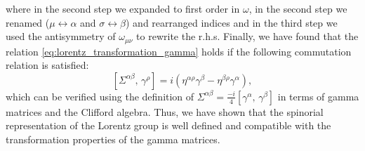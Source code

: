 where in the second step we expanded to first order in \(\omega\), in the second step we renamed (\(\mu \leftrightarrow \alpha\) and \(\sigma \leftrightarrow \beta\)) and rearranged indices and in the third step we used the antisymmetry of \(\omega_{\mu \nu}\) to rewrite the r.h.s. Finally, we have found that the relation \eqref{eq:lorentz_transformation_gamma} holds if the following commutation relation is satisfied:
\begin{equation}
    \left[ \Sigma^{\alpha \beta},\, \gamma^\rho \right] = i \left( \eta^{\alpha \rho} \gamma^{\beta} - \eta^{\beta \rho} \gamma^{\alpha} \right),
    \label{eq:commutation_Sigma_gamma}
\end{equation}
which can be verified using the definition of \(\Sigma^{\alpha \beta} = \frac{-i}{4} [\gamma^{\alpha},\, \gamma^{\beta}]\) in terms of gamma matrices and the Clifford algebra. Thus, we have shown that the spinorial representation of the Lorentz group is well defined and compatible with the transformation properties of the gamma matrices.

